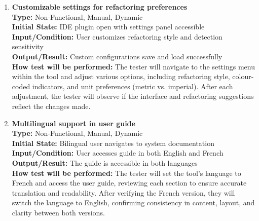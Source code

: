 \documentclass[12pt, titlepage]{article}
\begin{document}
\begin{enumerate}[label={\bf \textcolor{Maroon}{test-UH-\arabic*}},
    wide=0pt, font=\itshape]
  \item \textbf{Customizable settings for refactoring preferences} \\[2mm]
    \textbf{Type:} Non-Functional, Manual, Dynamic \\
    \textbf{Initial State:} IDE plugin open with settings panel accessible \\
    \textbf{Input/Condition:} User customizes refactoring style and
    detection sensitivity \\
    \textbf{Output/Result:} Custom configurations save and load
    successfully \\[2mm]
    \textbf{How test will be performed:} The tester will navigate to
    the settings menu within the tool and adjust various options,
    including refactoring style, colour-coded indicators, and unit
    preferences (metric vs. imperial). After each adjustment, the
    tester will observe if the interface and refactoring suggestions
    reflect the changes made.

  \item \textbf{Multilingual support in user guide} \\[2mm]
    \textbf{Type:} Non-Functional, Manual, Dynamic \\
    \textbf{Initial State:} Bilingual user navigates to system documentation \\
    \textbf{Input/Condition:} User accesses guide in both English and French \\
    \textbf{Output/Result:} The guide is accessible in both languages \\[2mm]
    \textbf{How test will be performed:} The tester will set the
    tool’s language to French and access the user guide, reviewing
    each section to ensure accurate translation and readability.
    After verifying the French version, they will switch the language
    to English, confirming consistency in content, layout, and
    clarity between both versions.


\end{enumerate}
\end{document}
